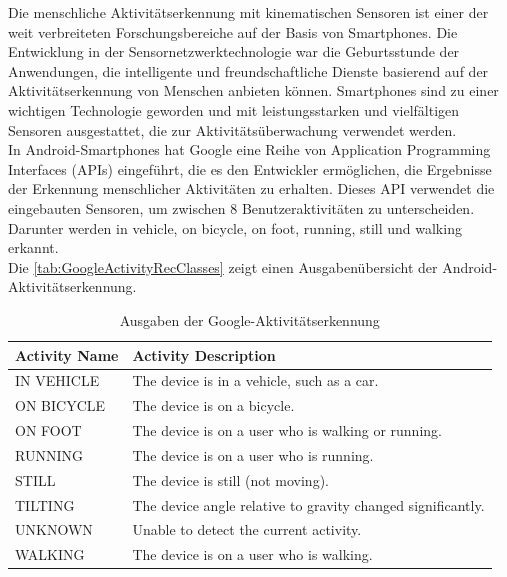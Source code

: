 Die menschliche Aktivitätserkennung mit kinematischen Sensoren ist einer der weit verbreiteten Forschungsbereiche auf der Basis von Smartphones. Die Entwicklung in der Sensornetzwerktechnologie war die Geburtsstunde der Anwendungen, die intelligente und freundschaftliche Dienste basierend auf der Aktivitätserkennung von Menschen anbieten können.
Smartphones sind zu einer wichtigen Technologie geworden und mit leistungsstarken und vielfältigen Sensoren ausgestattet, die zur Aktivitätsüberwachung verwendet werden. \citep{Rasheed2015} \\

In Android-Smartphones hat Google eine Reihe von Application Programming Interfaces (APIs) eingeführt, die es den Entwickler ermöglichen, die Ergebnisse der Erkennung menschlicher Aktivitäten zu erhalten.
Dieses API verwendet die eingebauten Sensoren, um zwischen 8 Benutzeraktivitäten zu unterscheiden. Darunter werden \glqq in vehicle\grqq{}, \glqq on bicycle\grqq{}, \glqq on foot\grqq{}, \glqq running\grqq{}, \glqq still\grqq{} und \glqq walking\grqq{} erkannt. \citep{Tran2016}\citep{Elbayoumy2018}\\

Die \autoref{tab:GoogleActivityRecClasses} zeigt einen Ausgabenübersicht der Android-Aktivitätserkennung. \\

\begin{table}[htpb]
	\caption{Ausgaben der Google-Aktivitätserkennung\citep{Elbayoumy2018}} 
	\centering
	\begin{tabular} {|l|l|} %
		\hline
		\textbf{Activity Name} & \textbf{Activity Description}\\
		\hline
		IN VEHICLE & The device is in a vehicle, such as a car.\\
		\hline
		ON BICYCLE & The device is on a bicycle.\\
		\hline
		ON FOOT & The device is on a user who is walking or running.\\
		\hline
		RUNNING & The device is on a user who is running.\\
		\hline
		STILL  & The device is still (not moving).\\
		\hline
		TILTING  & The device angle relative to gravity changed significantly.\\
		\hline
		UNKNOWN  & Unable to detect the current activity.\\
		\hline
		WALKING & The device is on a user who is walking.\\
		\hline
	\end{tabular}
	\label{tab:GoogleActivityRecClasses}
\end{table}

